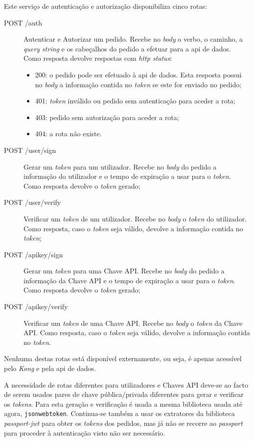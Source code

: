Este serviço de autenticação e autorização disponibiliza cinco rotas:
\begin{description}
    \item[POST /auth] Autenticar e Autorizar um pedido. Recebe no \textit{body} o verbo, o caminho, a \textit{query string} e os cabeçalhos do pedido a efetuar para a \acrshort{api} de dados. Como resposta devolve respostas com \textit{\acrshort{http} status}:
    \begin{itemize}
        \item 200: o pedido pode ser efetuado à \acrshort{api} de dados. Esta resposta possui no \textit{body} a informação contida no \textit{token} se este for enviado no pedido;
        \item 401: \textit{token} inválido ou pedido sem autenticação para aceder a rota;
        \item 403: pedido sem autorização para aceder a rota;
        \item 404: a rota não existe.
    \end{itemize}
    \item[POST /user/sign] Gerar um \textit{token} para um utilizador. Recebe no \textit{body} do pedido a informação do utilizador e o tempo de expiração a usar para o \textit{token}. Como resposta devolve o \textit{token} gerado;
    \item[POST /user/verify] Verificar um \textit{token} de um utilizador. Recebe no \textit{body} o \textit{token} do utilizador. Como resposta, caso o \textit{token} seja válido, devolve a informação contida no \textit{token};
    \item[POST /apikey/sign] Gerar um \textit{token} para uma Chave API. Recebe no \textit{body} do pedido a informação da Chave API e o tempo de expiração a usar para o \textit{token}. Como resposta devolve o \textit{token} gerado;
    \item[POST /apikey/verify] Verificar um \textit{token} de uma Chave API. Recebe no \textit{body} o \textit{token} da Chave API. Como resposta, caso o \textit{token} seja válido, devolve a informação contida no \textit{token}.
\end{description}

Nenhuma destas rotas está disponível externamente, ou seja, é apenas acessível pelo \textit{Kong} e pela \acrshort{api} de dados.

A necessidade de rotas diferentes para utilizadores e Chaves API deve-se ao facto de serem usados pares de chave pública/privada diferentes para gerar e verificar os \textit{tokens}. Para esta geração e verificação é usada a mesma biblioteca usada até agora, \texttt{jsonwebtoken}. Continua-se também a usar os extratores da biblioteca \textit{passport-jwt} para obter os \textit{tokens} dos pedidos, mas já não se recorre ao \textit{passport} para proceder à autenticação visto não ser necessário.

